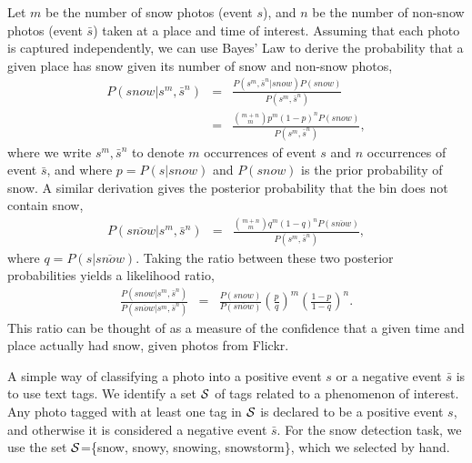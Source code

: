 Let $m$ be the number of snow
photos (event $s$), and $n$ be the number of non-snow photos (event
$\bar{s}$) taken at a place and time of interest. Assuming that each photo is captured
independently, we can use Bayes' Law to
derive the probability that a given place has snow
given its number of snow and non-snow photos,
%
\newcommand{\smsn}{s^m, \bar{s}^n}
\newcommand{\smsntwo}{s^m, \bar{s}^n}
\begin{eqnarray*}
P(snow|\smsn)  &=&\frac{ P(\smsn|snow)P(snow)}{P(\smsntwo)}  \\
&=&\frac{{m+n\choose m}p^{m}(1-p)^{n}P(snow)}{P(\smsntwo)},  
\end{eqnarray*}
%
where we write $s^m, \bar{s}^n$ to denote $m$ occurrences of event $s$ and $n$ occurrences of event $\bar{s}$, and where $p=P(s|snow)$ and $P(snow)$ is the prior probability of snow. A similar derivation gives the posterior probability that the bin does not contain snow,
%
\begin{eqnarray*}
P(\overline{snow}|\smsn)  &=&\frac{{m+n\choose m}q^{m}(1-q)^{n}P(\overline{snow})}{P(\smsntwo)},  
\end{eqnarray*}
%
where $q=P(s|\overline{snow})$. 
%
Taking the ratio between these two posterior probabilities yields a likelihood ratio,
%
\begin{eqnarray}
\frac{P(snow|\smsn)}{P(\overline{snow}|\smsntwo)}
&=&\frac{P(snow)}{P(\overline{snow})}\left(\frac{p}{q}\right)^{m}\left(\frac{1-p}{1-q}\right)^n.
\label{eq:conf}
\end{eqnarray}
%
This ratio can be thought of as a measure of the confidence that a
given time and place actually had snow, given photos from Flickr.

A simple way of classifying a photo into a positive event $s$ or a
negative event $\bar{s}$ is to use text tags. We identify a
set ${\cal S}$ of tags related to a phenomenon of
interest. Any photo tagged with at least one tag in ${\cal S}$ is
declared to be a positive event $s$, and otherwise it is considered a
negative event $\bar{s}$. For the snow detection task, we use the set
${\cal S}$=\{snow, snowy, snowing, snowstorm\}, which we selected
by hand.

